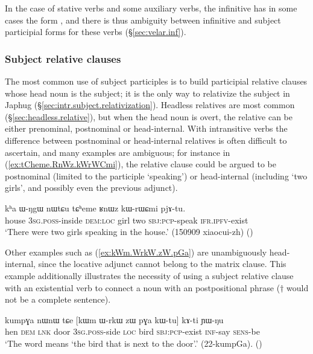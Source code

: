 In the case of stative verbs and some auxiliary verbs, the infinitive has in some cases the form , and there is thus ambiguity between infinitive and subject participial forms for these verbs (§\ref{sec:velar.inf}).

\subsubsection{Subject relative clauses}  \label{sec:subject.participle.subject.relative}
The most common use of subject participles is to build participial relative clauses whose head noun is the subject; it is the only way to relativize the subject in Japhug (§\ref{sec:intr.subject.relativization}). Headless relatives are most common (§\ref{sec:headless.relative}), but when the head noun is overt, the relative can be either prenominal, postnominal or head-internal. With intransitive verbs the difference between postnominal or head-internal relatives is often difficult to ascertain, and many examples are ambiguous; for instance in (\ref{ex:tCheme.RnWz.kWrWCmi}), the relative clause could be argued to be postnominal (limited to the participle  `speaking') or head-internal (including  `two girls', and possibly even the previous adjunct).

\begin{exe}
\ex \label{ex:tCheme.RnWz.kWrWCmi}
 \gll  kʰa ɯ-ŋgɯ nɯtɕu tɕʰeme ʁnɯz kɯ-rɯɕmi pjɤ-tu. \\
 house \textsc{3sg}.\textsc{poss}-inside \textsc{dem}:\textsc{loc} girl two \textsc{sbj}:\textsc{pcp}-speak \textsc{ifr}.\textsc{ipfv}-exist \\
\glt  `There were two girls speaking in the house.' (150909 xiaocui-zh)
()
\end{exe}

Other examples such as (\ref{ex:kWm.WrkW.zW.pGa}) are unambiguously head-internal, since the locative adjunct  cannot belong to the matrix clause. This example additionally illustrates the necessity of using a subject relative clause with an existential verb to connect a noun with an postpositional phrase ($\dagger$ would not be a complete sentence).

\begin{exe}
\ex \label{ex:kWm.WrkW.zW.pGa}
 \gll  kumpɣa nɯnɯ tɕe [kɯm ɯ-rkɯ zɯ pɣa kɯ-tu] kɤ-ti ɲɯ-ŋu  \\
 hen \textsc{dem} \textsc{lnk} door \textsc{3sg}.\textsc{poss}-side \textsc{loc} bird \textsc{sbj}:\textsc{pcp}-exist \textsc{inf}-say \textsc{sens}-be \\
 \glt `The word  means `the bird that is next to the door'.' (22-kumpGa). 
()
\end{exe}

